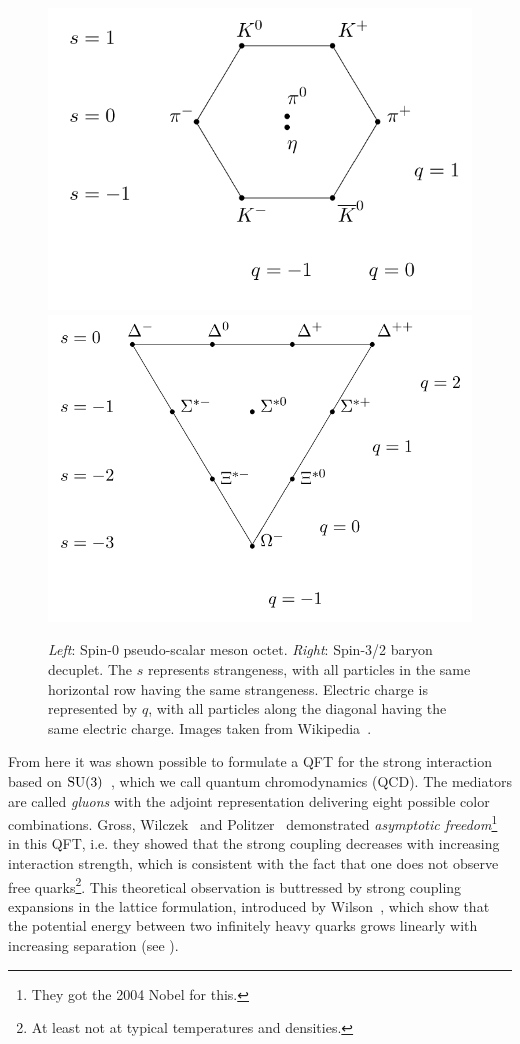 \begin{figure}[t]
  \centering
  \includegraphics[width=0.48\linewidth]{figs/Meson_octet.png}
  \includegraphics[width=0.48\linewidth]{figs/Baryon_decuplet.png}
  \caption{{\it Left}: Spin-0 pseudo-scalar meson octet. {\it Right}:
           Spin-3/2 baryon decuplet. The $s$ represents strangeness,
           with all particles in the same horizontal row having the
           same strangeness. Electric charge is represented by $q$,
           with all particles along the diagonal having the same
           electric charge. Images taken from
           Wikipedia~\cite{wiki_eightfold}.}
  \label{fig:eightfold}
\end{figure}

From here it was shown possible to formulate a QFT for the strong interaction
based on $\operatorname{SU}(3)$~\cite{fritzsch_advantages_1973}, which we
call quantum chromodynamics (QCD).
The mediators are called
{\it gluons} with the adjoint representation delivering
eight possible color combinations.
Gross, Wilczek~\cite{gross_d.j._ultraviolet_1973} and
Politzer~\cite{politzer_reliable_1973} demonstrated
{\it asymptotic freedom}\footnote{They got the 2004 Nobel for this.}
 in this QFT, i.e. they showed that the
strong coupling decreases with increasing interaction strength, which is
consistent with the fact that one does not observe free quarks\footnote{At
least not at typical temperatures and densities.}.
This theoretical observation is buttressed by strong coupling
expansions in the lattice formulation, introduced by 
Wilson~\cite{wilson_confinement_1974}, which show that the potential
energy between two infinitely heavy quarks grows linearly with
increasing separation
(see ).

